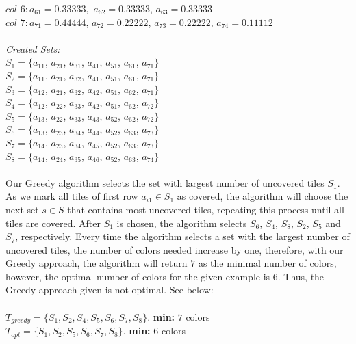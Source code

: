 \documentclass{article}
\begin{document}
$col$ $6 : a_{61} = 0.33333,$ $a_{62} = 0.33333$, $a_{63} = 0.33333$\\
$col$ $7 : a_{71} = 0.44444$, $a_{72} = 0.22222$, $a_{73} = 0.22222$, $a_{74} = 0.11112$\\
\\\textit{Created Sets:}\\
$S_1 = \{a_{11}$, $a_{21}$, $a_{31}$, $a_{41}$, $a_{51}$, $a_{61}$, $a_{71} \}$\\
$S_2 = \{a_{11}$, $a_{21}$, $a_{32}$, $a_{41}$, $a_{51}$, $a_{61}$, $a_{71} \}$\\
$S_3 = \{a_{12}$, $a_{21}$, $a_{32}$, $a_{42}$, $a_{51}$, $a_{62}$, $a_{71} \}$\\
$S_4 = \{a_{12}$, $a_{22}$, $a_{33}$, $a_{42}$, $a_{51}$, $a_{62}$, $a_{72} \}$\\
$S_5 = \{a_{13}$, $a_{22}$, $a_{33}$, $a_{43}$, $a_{52}$, $a_{62}$, $a_{72}\}$\\
$S_6 = \{a_{13}$, $a_{23}$, $a_{34}$, $a_{44}$, $a_{52}$, $a_{63}$, $a_{73}\}$\\
$S_7 = \{a_{14}$, $a_{23}$, $a_{34}$, $a_{45}$, $a_{52}$, $a_{63}$, $a_{73}\}$\\
$S_8 = \{a_{14}$, $a_{24}$, $a_{35}$, $a_{46}$, $a_{52}$, $a_{63}$, $a_{74}\}$\\
\\
Our Greedy algorithm selects the set with largest number of uncovered tiles $S_1$. As we mark all tiles of first row $a_{i1} \in S_1$ as covered, the algorithm will choose the next set $s \in S$ that contains most uncovered tiles, repeating this process until all tiles are covered. After $S_1$ is chosen, the algorithm selects $S_6$, $S_4$, $S_8$, $S_2$, $S_5$ and $S_7$, respectively. Every time the algorithm selects a set with the largest number of uncovered tiles, the number of colors needed increase by one, therefore, with our Greedy approach, the algorithm will return $7$ as the minimal number of colors, however, the optimal number of colors for the given example is $6$. Thus, the Greedy approach given is not optimal. See below:\\
\\
$T_{greedy} = \{S_1, S_2, S_4, S_5, S_6, S_7, S_8\}$. \textbf{min:} $7$ colors\\
$T_{opt} = \{S_1, S_2, S_5, S_6, S_7, S_8\}$. \textbf{min:} 6 colors\\
\end{document}
